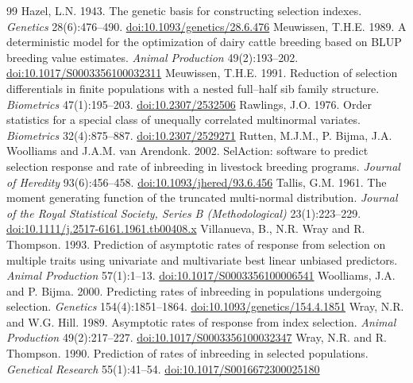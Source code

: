 \documentclass[11pt]{article}
\begin{document}
\begin{thebibliography}{99}
 Hazel, L.N. 1943. The genetic basis for constructing selection indexes. \emph{Genetics} 28(6):476--490. \href{https://doi.org/10.1093/genetics/28.6.476}{doi:10.1093/genetics/28.6.476}
 Meuwissen, T.H.E. 1989. A deterministic model for the optimization of dairy cattle breeding based on BLUP breeding value estimates. \emph{Animal Production} 49(2):193--202. \href{https://doi.org/10.1017/S0003356100032311}{doi:10.1017/S0003356100032311}
 Meuwissen, T.H.E. 1991. Reduction of selection differentials in finite populations with a nested full--half sib family structure. \emph{Biometrics} 47(1):195--203. \href{https://doi.org/10.2307/2532506}{doi:10.2307/2532506}
 Rawlings, J.O. 1976. Order statistics for a special class of unequally correlated multinormal variates. \emph{Biometrics} 32(4):875--887. \href{https://doi.org/10.2307/2529271}{doi:10.2307/2529271}
 Rutten, M.J.M., P. Bijma, J.A. Woolliams and J.A.M. van Arendonk. 2002. SelAction: software to predict selection response and rate of inbreeding in livestock breeding programs. \emph{Journal of Heredity} 93(6):456--458. \href{https://doi.org/10.1093/jhered/93.6.456}{doi:10.1093/jhered/93.6.456}
 Tallis, G.M. 1961. The moment generating function of the truncated multi-normal distribution. \emph{Journal of the Royal Statistical Society, Series B (Methodological)} 23(1):223--229. \href{https://doi.org/10.1111/j.2517-6161.1961.tb00408.x}{doi:10.1111/j.2517-6161.1961.tb00408.x}
 Villanueva, B., N.R. Wray and R. Thompson. 1993. Prediction of asymptotic rates of response from selection on multiple traits using univariate and multivariate best linear unbiased predictors. \emph{Animal Production} 57(1):1--13. \href{https://doi.org/10.1017/S0003356100006541}{doi:10.1017/S0003356100006541}
 Woolliams, J.A. and P. Bijma. 2000. Predicting rates of inbreeding in populations undergoing selection. \emph{Genetics} 154(4):1851--1864. \href{https://doi.org/10.1093/genetics/154.4.1851}{doi:10.1093/genetics/154.4.1851}
 Wray, N.R. and W.G. Hill. 1989. Asymptotic rates of response from index selection. \emph{Animal Production} 49(2):217--227. \href{https://doi.org/10.1017/S0003356100032347}{doi:10.1017/S0003356100032347}
 Wray, N.R. and R. Thompson. 1990. Prediction of rates of inbreeding in selected populations. \emph{Genetical Research} 55(1):41--54. \href{https://doi.org/10.1017/S0016672300025180}{doi:10.1017/S0016672300025180}
\end{thebibliography}
\end{document}
